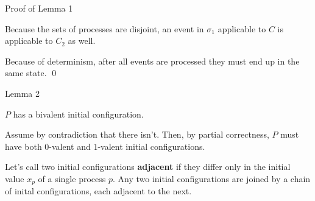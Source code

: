 \documentclass[12pt]{beamer}
\begin{document}
  \begin{frame}{Proof of Lemma 1}
    \begin{figure}
    \end{figure}

    Because the sets of processes are disjoint, an event in \(\sigma_1\)
    applicable to \(C\) is applicable to \(C_2\) as well.

    \vspace{0.25cm}

    Because of determinism, after all events are processed they must end up in
    the same state. \qed

  \end{frame}

  \begin{frame}{Lemma 2}
    \begin{lemma}
      \(P\) has a bivalent initial configuration.
    \end{lemma}

    \vspace{0.25cm}

    Assume by contradiction that there isn't. Then, by partial correctness,
    \(P\) must have both \(0\)-valent and \(1\)-valent initial configurations.

    \vspace{0.25cm}

    Let's call two initial configurations \textbf{adjacent} if they differ only
    in the initial value \(x_p\) of a single process \(p\). Any two initial
    configurations are joined by a chain of inital configurations, each
    adjacent to the next.
  \end{frame}
\end{document}
